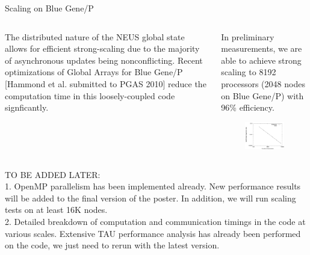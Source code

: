 \documentclass[final]{beamer}
\begin{document}
\begin{columns}[t]
\begin{column}{.25 \linewidth}
\begin{block}{Scaling on Blue Gene/P}
	  \begin{columns}[t]
	    \begin{column}{.32\linewidth}
	      The distributed nature of the NEUS global state allows for efficient strong-scaling due to the majority of asynchronous updates being nonconflicting.  Recent optimizations of Global Arrays for Blue Gene/P [Hammond et al. submitted to PGAS 2010] reduce the computation time in this loosely-coupled code signficantly.
	    \end{column}
	    \begin{column}{.65\linewidth}
                In preliminary measurements, we are able to achieve strong scaling to 8192 processors (2048 nodes on Blue Gene/P) with 96\% efficiency.
                \begin{figure}[hctp]
                    \includegraphics[width=1.0\linewidth]{images/scale.pdf}
                \end{figure}
	    \end{column}
	  \end{columns}
          {\color{red} TO BE ADDED LATER:} \\
          {\color{red} 1.} OpenMP parallelism has been implemented already.  New performance results will be added to the final version of the poster.  In addition, we will run scaling tests on at least 16K nodes. \\
          {\color{red} 2.} Detailed breakdown of computation and communication timings in the code at various scales.  Extensive TAU performance analysis has already been performed on the code, we just need to rerun with the latest version.
        \end{block}
      \end{column}


\end{columns}
\end{document}
